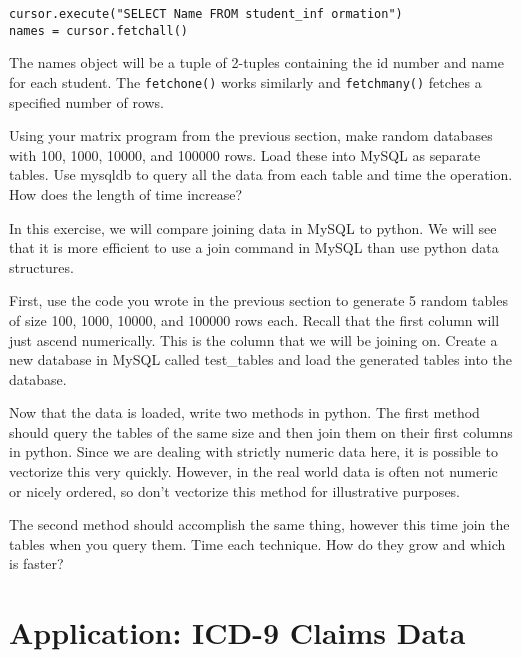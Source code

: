 \begin{lstlisting}
cursor.execute("SELECT Name FROM student_inf ormation")
names = cursor.fetchall()

\end{lstlisting}

The names object will be a tuple of 2-tuples containing the id number and name for each student.  The {\tt fetchone()} works similarly and {\tt fetchmany()} fetches a specified number of rows.


\begin{problem}

Using your matrix program from the previous section, make random databases with 100, 1000, 10000, and 100000 rows.  Load these into MySQL as separate tables.  Use mysqldb to query all the data from each table and time the operation.  How does the length of time increase?

\end{problem}

\begin{problem}

In this exercise, we will compare joining data in MySQL to python.  We will see that it is more efficient to use a join command in MySQL than use python data structures.

First, use the code you wrote in the previous section to generate 5 random tables of size 100, 1000, 10000, and 100000 rows each.  Recall that the first column will just ascend numerically.  This is the column that we will be joining on.  Create a new database in MySQL called test\_tables and load the generated tables into the database.

Now that the data is loaded, write two methods in python.  The first method should query the tables of the same size and then join them on their first columns in python.  Since we are dealing with strictly numeric data here, it is possible to vectorize this very quickly.  However, in the real world data is often not numeric or nicely ordered, so don't vectorize this method for illustrative purposes.

The second method should accomplish the same thing, however this time join the tables when you query them.  Time each technique.  How do they grow and which is faster?
\end{problem}

\section{Application: ICD-9 Claims Data}

